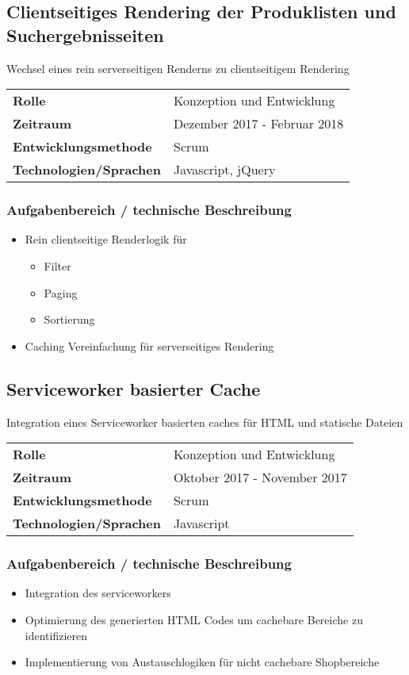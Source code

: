 \documentclass[10pt,ngerman,a4paper]{article}
\begin{document}
\subsection{Clientseitiges Rendering der Produklisten und Suchergebnisseiten}
Wechsel eines rein serverseitigen Renderns zu clientseitigem Rendering

\begin{tabular}{ll}
\textbf{Rolle} & Konzeption und Entwicklung \\
\textbf{Zeitraum} & Dezember 2017 - Februar 2018\\
\textbf{Entwicklungsmethode} & Scrum\\
\textbf{Technologien/Sprachen} & Javascript, jQuery\\
\end{tabular}

\subsubsection{Aufgabenbereich / technische Beschreibung}
\begin{itemize}
\item Rein clientseitige Renderlogik für
\begin{itemize}
\item Filter
\item Paging
\item Sortierung
\end{itemize}
\item Caching Vereinfachung für serverseitiges Rendering
\end{itemize}

\subsection{Serviceworker basierter Cache}
Integration eines Serviceworker basierten caches für HTML und statische Dateien

\begin{tabular}{ll}
\textbf{Rolle} & Konzeption und Entwicklung \\
\textbf{Zeitraum} & Oktober 2017 - November 2017\\
\textbf{Entwicklungsmethode} & Scrum\\
\textbf{Technologien/Sprachen} & Javascript\\
\end{tabular}

\subsubsection{Aufgabenbereich / technische Beschreibung}
\begin{itemize}
\item Integration des serviceworkers
\item Optimierung des generierten HTML Codes um cachebare Bereiche zu identifizieren
\item Implementierung von Austauschlogiken für nicht cachebare Shopbereiche
\end{itemize}
\end{document}

